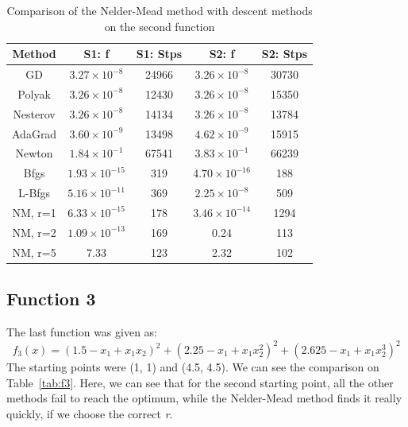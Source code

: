 \documentclass[9pt]{IEEEtran}
\begin{document}
\begin{table}[h]
    \centering
    \begin{tabular}{|c|c|c|c|c|}
        \hline
        \textbf{Method} & \textbf{S1: f} & \textbf{S1: Stps} & \textbf{S2: f} & \textbf{S2: Stps} \\ \hline
        GD       & $3.27 \times 10^{-8}$ & 24966  & $3.26 \times 10^{-8}$  & 30730 \\ \hline
        Polyak   & $3.26 \times 10^{-8}$ & 12430 & $3.26 \times 10^{-8}$   & 15350 \\ \hline
        Nesterov & $3.26 \times 10^{-8}$& 14134   & $3.26 \times 10^{-8}$  & 13784 \\ \hline
        AdaGrad  & $3.60 \times 10^{-9}$  & 13498   & $4.62 \times 10^{-9}$& 15915 \\ \hline
        Newton   & $1.84 \times 10^{-1}$ & 67541  & $3.83\times 10^{-1}$  & 66239 \\ \hline
        Bfgs     & $1.93 \times 10^{-15}$& 319 & $4.70 \times 10^{-16}$     & 188   \\ \hline
        L-Bfgs   & $5.16 \times 10^{-11}$  & 369& $2.25 \times 10^{-8}$    & 509   \\ \hline
        NM, r=1 & $6.33 \times 10^{-15}$  & 178 & $3.46 \times 10^{-14}$ & 1294  \\ \hline
        NM, r=2 & $1.09 \times 10^{-13}$  & 169 & 0.24 & 113 \\ \hline
        NM, r=5 & 7.33 & 123 & 2.32 & 102  \\ \hline
    
    \end{tabular}
    \caption{Comparison of the Nelder-Mead method with descent methods on the second 
    function}
    \label{tab:f2}
\end{table}


\subsection*{Function 3}
The last function was given as: 
\[
f_3(x) = (1.5 - x_1 + x_1 x_2)^2 + (2.25 - x_1 + x_1 x_2^2)^2 + (2.625 - x_1 + x_1 x_2^3)^2
\]
The starting points were (1, 1) and (4.5, 4.5). We can see the comparison on 
Table~\ref{tab:f3}. Here, we can see that for the second starting point, all the 
other methods fail to reach the optimum, while the Nelder-Mead method finds it 
really quickly, if we choose the correct \textit{r}. 
\end{document}
